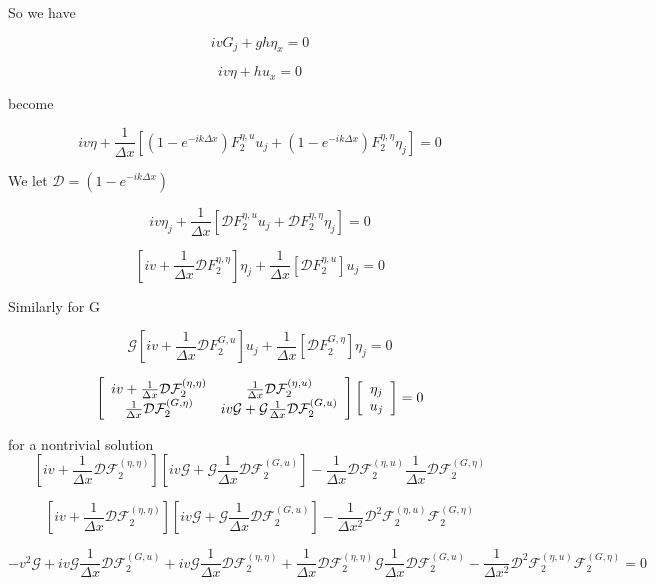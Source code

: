 \documentclass[12pt]{article}
\begin{document}
So we have

\[ ivG_j  + gh \eta_x  = 0\]

\[iv\eta + h u_x = 0\]

become

\[iv\eta + \frac{1}{\Delta x}\left[(1 - e^{-ik\Delta x})F^{\eta,u}_2 u_{j} + (1 - e^{-ik\Delta x})F^{\eta,\eta}_2 \eta_{j} \right]  = 0\]

We let $\mathcal{D} = (1 - e^{-ik\Delta x})$

\[iv\eta_j + \frac{1}{\Delta x}\left[\mathcal{D}F^{\eta,u}_2 u_{j} + \mathcal{D}F^{\eta,\eta}_2 \eta_{j} \right]  = 0\]

\[\left[iv + \frac{1}{\Delta x}\mathcal{D}F^{\eta,\eta}_2\right]\eta_j + \frac{1}{\Delta x}\left[\mathcal{D}F^{\eta,u}_2 \right] u_{j}   = 0\]

Similarly for G

\[\mathcal{G}\left[iv + \frac{1}{\Delta x}\mathcal{D}F^{G,u}_2\right]u_j + \frac{1}{\Delta x}\left[\mathcal{D}F^{G,\eta}_2 \right] \eta_{j}   = 0\]


\[ \left[\begin{array}{c c}
iv + \frac{1}{\Delta x} \mathcal{D}\mathcal{F}_2^{(\eta,\eta)}  & \frac{1}{\Delta x} \mathcal{D}\mathcal{F}_2^{(\eta,u)}\\
\frac{1}{\Delta x} \mathcal{D}\mathcal{F}_2^{(G,\eta)} &
iv\mathcal{G} + \mathcal{G} \frac{1}{\Delta x} \mathcal{D}\mathcal{F}_2^{(G,u)} 
\end{array} \right] 
\left[\begin{array}{c}
\eta_j \\
u_j
\end{array} \right] = 0\]

for a nontrivial solution
\[\left[iv + \frac{1}{\Delta x} \mathcal{D}\mathcal{F}_2^{(\eta,\eta)}\right]\left[iv\mathcal{G} + \mathcal{G} \frac{1}{\Delta x} \mathcal{D}\mathcal{F}_2^{(G,u)} \right] - \frac{1}{\Delta x} \mathcal{D}\mathcal{F}_2^{(\eta,u)}\frac{1}{\Delta x} \mathcal{D}\mathcal{F}_2^{(G,\eta)}\]

\[\left[iv + \frac{1}{\Delta x} \mathcal{D}\mathcal{F}_2^{(\eta,\eta)}\right]\left[iv\mathcal{G} + \mathcal{G} \frac{1}{\Delta x} \mathcal{D}\mathcal{F}_2^{(G,u)} \right] - \frac{1}{\Delta x^2} \mathcal{D}^2\mathcal{F}_2^{(\eta,u)} \mathcal{F}_2^{(G,\eta)}\]

\[ -v^2\mathcal{G} + iv\mathcal{G} \frac{1}{\Delta x} \mathcal{D}\mathcal{F}_2^{(G,u)} + iv\mathcal{G}\frac{1}{\Delta x} \mathcal{D}\mathcal{F}_2^{(\eta,\eta)} + \frac{1}{\Delta x} \mathcal{D}\mathcal{F}_2^{(\eta,\eta)}\mathcal{G} \frac{1}{\Delta x} \mathcal{D}\mathcal{F}_2^{(G,u)}  - \frac{1}{\Delta x^2} \mathcal{D}^2\mathcal{F}_2^{(\eta,u)} \mathcal{F}_2^{(G,\eta)} = 0\]
\end{document}
